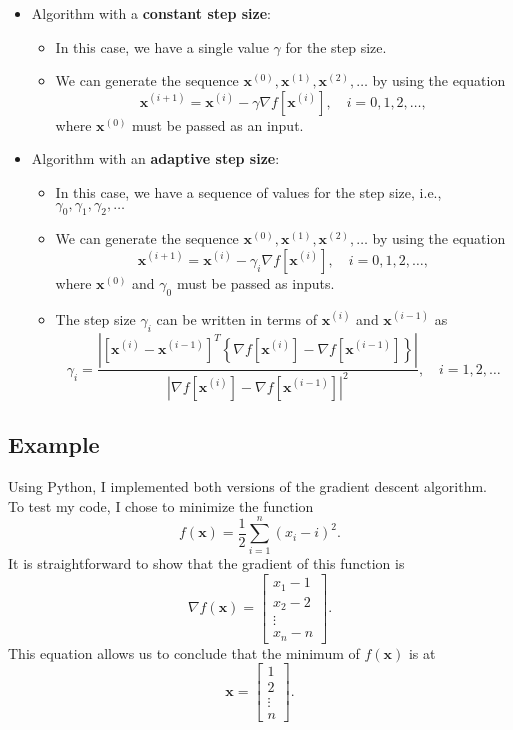 \documentclass[10pt,american]{scrartcl}
\begin{document}
\begin{itemize}
\item Algorithm with a \textbf{constant step size}:
\begin{itemize}
\item In this case, we have a single value $\gamma$ for the step size.
\item We can generate the sequence $\mathbf{x}^{\left(0\right)},\mathbf{x}^{\left(1\right)},\mathbf{x}^{\left(2\right)},\ldots$
by using the equation
\[
\mathbf{x}^{\left(i+1\right)}=\mathbf{x}^{\left(i\right)}-\gamma\nabla f\left[\mathbf{x}^{\left(i\right)}\right],\quad i=0,1,2,\ldots,
\]
where $\mathbf{x}^{\left(0\right)}$ must be passed as an input.
\end{itemize}
\item Algorithm with an \textbf{adaptive step size}:
\begin{itemize}
\item In this case, we have a sequence of values for the step size, i.e.,
$\gamma_{0},\gamma_{1},\gamma_{2},\ldots$
\item We can generate the sequence $\mathbf{x}^{\left(0\right)},\mathbf{x}^{\left(1\right)},\mathbf{x}^{\left(2\right)},\ldots$
by using the equation
\[
\mathbf{x}^{\left(i+1\right)}=\mathbf{x}^{\left(i\right)}-\gamma_{i}\nabla f\left[\mathbf{x}^{\left(i\right)}\right],\quad i=0,1,2,\ldots,
\]
where $\mathbf{x}^{\left(0\right)}$ and $\gamma_{0}$ must be passed
as inputs.
\item The step size $\gamma_{i}$ can be written in terms of $\mathbf{x}^{\left(i\right)}$
and $\mathbf{x}^{\left(i-1\right)}$ as
\[
\gamma_{i}=\frac{\left|\left[\mathbf{x}^{\left(i\right)}-\mathbf{x}^{\left(i-1\right)}\right]^{T}\left\{ \nabla f\left[\mathbf{x}^{\left(i\right)}\right]-\nabla f\left[\mathbf{x}^{\left(i-1\right)}\right]\right\} \right|}{\left|\nabla f\left[\mathbf{x}^{\left(i\right)}\right]-\nabla f\left[\mathbf{x}^{\left(i-1\right)}\right]\right|^{2}},\quad i=1,2,\ldots
\]
\end{itemize}
\end{itemize}

\subsection*{Example}

Using Python, I implemented both versions of the gradient descent
algorithm.\\To test my code, I chose to minimize the function
\[
f\left(\mathbf{x}\right)=\frac{1}{2}\sum_{i=1}^{n}\left(x_{i}-i\right)^{2}.
\]
It is straightforward to show that the gradient of this function is
\[
\nabla f\left(\mathbf{x}\right)=\begin{bmatrix}x_{1}-1\\
x_{2}-2\\
\vdots\\
x_{n}-n
\end{bmatrix}.
\]
This equation allows us to conclude that the minimum of $f\left(\mathbf{x}\right)$
is at
\[
\mathbf{x}=\begin{bmatrix}1\\
2\\
\vdots\\
n
\end{bmatrix}.
\]
\end{document}
